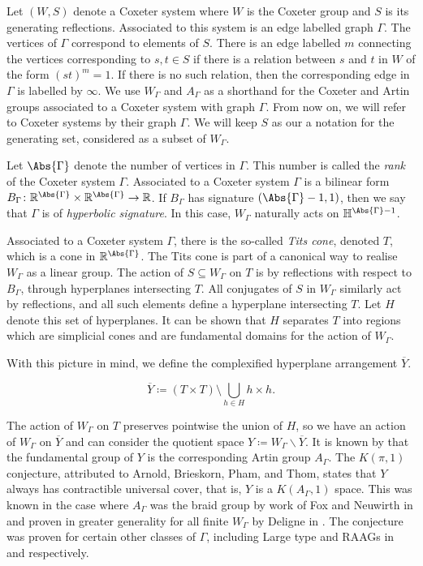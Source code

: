 Let $(W,S)$ denote a Coxeter system where $W$ is the Coxeter group and $S$ is its generating reflections.
Associated to this system is an edge labelled graph $\Gamma$.
The vertices of  $\Gamma$ correspond to elements of  $S$.
There is an edge labelled $m$ connecting the vertices corresponding to $s,t\in S$ if there is a relation between $s$ and  $t$ in  $W$ of the form  $(st)^m=1$.
If there is no such relation, then the corresponding edge in $\Gamma$ is labelled by $\infty$.
We use $W_\Gamma$ and  $A_\Gamma$  as a shorthand for the Coxeter and Artin groups associated to a Coxeter system with graph $\Gamma$.
From now on, we will refer to Coxeter systems by their graph $\Gamma$.
We will keep $S$ as our a notation for the generating set, considered as a subset of $W_\Gamma$.


Let $\Abs{\Gamma}$ denote the number of vertices in $\Gamma$.
This number is called the \emph{rank} of the Coxeter system $\Gamma$.
Associated to a Coxeter system  $\Gamma$ is a bilinear form $B_\Gamma \colon \R^{\Abs{\Gamma}} \times \R^{\Abs{\Gamma}} \to \R$.
If  $B_\Gamma$ has signature $(\Abs{\Gamma}-1,1)$, then we say that  $\Gamma$ is of \emph{hyperbolic signature}.
In this case, $W_\Gamma$ naturally acts on  $\Hbb^{\Abs{\Gamma}-1}$.

Associated to a Coxeter system $\Gamma$, there is the so-called \emph{Tits cone}, denoted $T$, which is a cone in $\R^{\Abs{\Gamma}}$.
The Tits cone is part of a canonical way to realise $W_\Gamma$ as a linear group.
The action of $S \subseteq W_\Gamma$ on  $T$ is by reflections with respect to $B_\Gamma$, through hyperplanes intersecting $T$.
All conjugates of $S$ in $W_\Gamma$ similarly act by reflections, and all such elements define a hyperplane intersecting $T$.
Let $H$ denote this set of hyperplanes.
It can be shown that $H$ separates  $T$ into regions which are simplicial cones and are fundamental domains for the action of  $W_\Gamma$.

With this picture in mind, we define the complexified hyperplane arrangement $\overline{Y}$.

\[
	\overline{Y} \coloneq \left(T \times T\right) \setminus \bigcup_{h \in H} h \times h
	.\]

The action of $W_\Gamma$ on $T$ preserves pointwise the union of $H$, so we have an action of $W_\Gamma$ on $\overline{Y}$ and can consider the quotient space  $Y \coloneq W_\Gamma \backslash \overline{Y}$.
It is known by \cite{lek_homotopy_1983} that the fundamental group of $Y$ is the corresponding Artin group  $A_\Gamma$.
The $K(\pi,1)$ conjecture, attributed to Arnold, Brieskorn, Pham, and Thom, states that $Y$ always has contractible universal cover, that is, $Y$ is a $K(A_\Gamma,1)$ space.
This was known in the case where $A_\Gamma$ was the braid group by work of Fox and Neuwirth in \cite{fox_neuwirth_braid_1962} and proven in greater generality for all finite $W_\Gamma$ by Deligne in \cite{deligne_immeubles_1972}.
The conjecture was proven for certain other classes of $\Gamma$, including Large type and RAAGs in \cite{hendriks_hyperplane_1985} and \cite{charney_davis_finite_2016} respectively.

